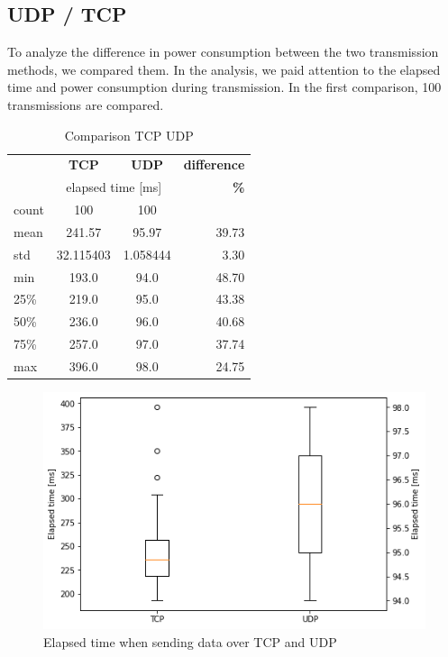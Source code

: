 \subsection{UDP / TCP}
To analyze the difference in power consumption between the two transmission methods,
we compared them. In the analysis, we paid attention to the elapsed time and power consumption during transmission. In the first comparison, 100 transmissions are compared.
\linebreak
\begin{table}[H]
    \begin{center}
    \caption{Comparison TCP UDP}
    \label{tab:table3}
    \begin{tabular}{|l|c|c|r|}
        \hline
        & \textbf{TCP} & \textbf{UDP} & \textbf{difference} \\
        & \multicolumn{2}{c|}{elapsed time [ms]} & \textbf{\%}\\
        \hline
        count & 100 & 100 & \\
        mean  & 241.57 & 95.97 & 39.73 \\
        std   & 32.115403 & 1.058444 & 3.30 \\
        min   & 193.0 & 94.0 & 48.70 \\
        25\%  & 219.0 & 95.0 & 43.38 \\
        50\%  & 236.0 & 96.0 & 40.68 \\
        75\%  & 257.0 & 97.0 & 37.74 \\
        max   & 396.0 & 98.0 & 24.75 \\
        \hline
    \end{tabular}
    \end{center}
\end{table}
\begin{figure}[H]
    \centering
    \includegraphics[width = 0.9 \linewidth]{fig/udp_tcp_elapsed_time_boxplot.png}
    \caption{Elapsed time when sending data over TCP and UDP}
    \label{fig:udp_tcp_boxplot_time}
    \end{figure}
